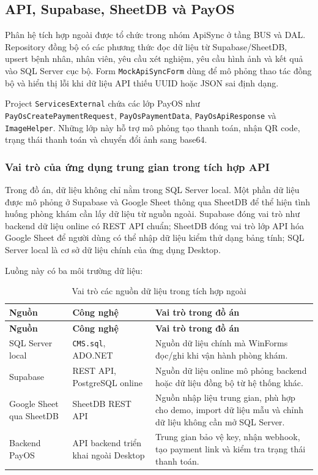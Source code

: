 \documentclass[12pt,a4paper]{article}
\numberwithin{figure}{subsection}
\numberwithin{table}{subsection}
\begin{document}
\subsection{API, Supabase, SheetDB và PayOS}

Phân hệ tích hợp ngoài được tổ chức trong nhóm ApiSync ở tầng BUS và DAL. Repository đồng bộ có các phương thức đọc dữ liệu từ Supabase/SheetDB, upsert bệnh nhân, nhân viên, yêu cầu xét nghiệm, yêu cầu hình ảnh và kết quả vào SQL Server cục bộ. Form \texttt{MockApiSyncForm} dùng để mô phỏng thao tác đồng bộ và hiển thị lỗi khi dữ liệu API thiếu UUID hoặc JSON sai định dạng.

Project \texttt{ServicesExternal} chứa các lớp PayOS như \texttt{PayOsCreatePaymentRequest}, \texttt{PayOsPaymentData}, \texttt{PayOsApiResponse} và \texttt{ImageHelper}. Những lớp này hỗ trợ mô phỏng tạo thanh toán, nhận QR code, trạng thái thanh toán và chuyển đổi ảnh sang base64.

\subsubsection{Vai trò của ứng dụng trung gian trong tích hợp API}

Trong đồ án, dữ liệu không chỉ nằm trong SQL Server local. Một phần dữ liệu được mô phỏng ở Supabase và Google Sheet thông qua SheetDB để thể hiện tình huống phòng khám cần lấy dữ liệu từ nguồn ngoài. Supabase đóng vai trò như backend dữ liệu online có REST API chuẩn; SheetDB đóng vai trò lớp API hóa Google Sheet để người dùng có thể nhập dữ liệu kiểm thử dạng bảng tính; SQL Server local là cơ sở dữ liệu chính của ứng dụng Desktop.

Luồng này có ba môi trường dữ liệu:

\begin{longtable}{|p{3.2cm}|p{4.6cm}|p{6cm}|}
\caption{Vai trò các nguồn dữ liệu trong tích hợp ngoài} \\
\hline
\textbf{Nguồn} & \textbf{Công nghệ} & \textbf{Vai trò trong đồ án} \\
\hline
\endfirsthead
\hline
\textbf{Nguồn} & \textbf{Công nghệ} & \textbf{Vai trò trong đồ án} \\
\hline
\endhead
SQL Server local & \texttt{CMS.sql}, ADO.NET & Nguồn dữ liệu chính mà WinForms đọc/ghi khi vận hành phòng khám. \\
\hline
Supabase & REST API, PostgreSQL online & Nguồn dữ liệu online mô phỏng backend hoặc dữ liệu đồng bộ từ hệ thống khác. \\
\hline
Google Sheet qua SheetDB & SheetDB REST API & Nguồn nhập liệu trung gian, phù hợp cho demo, import dữ liệu mẫu và chỉnh dữ liệu không cần mở SQL Server. \\
\hline
Backend PayOS & API backend triển khai ngoài Desktop & Trung gian bảo vệ key, nhận webhook, tạo payment link và kiểm tra trạng thái thanh toán. \\
\hline
\end{longtable}
\end{document}
